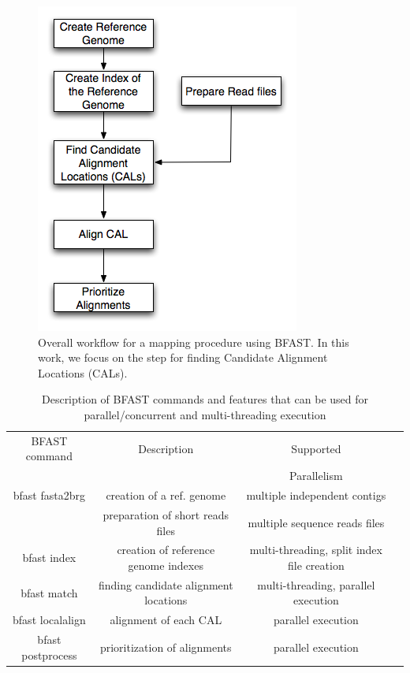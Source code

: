 \documentclass[12pt]{article}
\begin{document}
\begin{figure}
 \centering
\includegraphics[scale=0.45]{figures/workflow.png} 

\caption{\small Overall workflow for a mapping procedure using BFAST.  In this work, we focus on the step for finding Candidate Alignment Locations (CALs).  }
  \label{fig:workflow-bfast} 
 \end{figure}


\begin{table}
\begin{tabular}{|c|c|c|c|} 
  \hline 
 BFAST command & Description & Supported \\ 
  &  &     Parallelism \\\hline
bfast fasta2brg & creation of a ref. genome  &    multiple independent contigs \\
&  preparation of short reads files &     multiple sequence reads files \\
  bfast index & creation of reference genome indexes& multi-threading, split index file creation\\
 bfast match & finding candidate alignment locations  &  multi-threading, parallel execution \\
 bfast localalign & alignment of each CAL  &   parallel execution \\
bfast postprocess & prioritization of alignments  &  parallel execution \\ \hline


\hline
\end{tabular} \caption{Description of BFAST commands and features that can be used for parallel/concurrent and multi-threading execution}
 \label{table:bfast-summary} 
\end{table}
\end{document}
